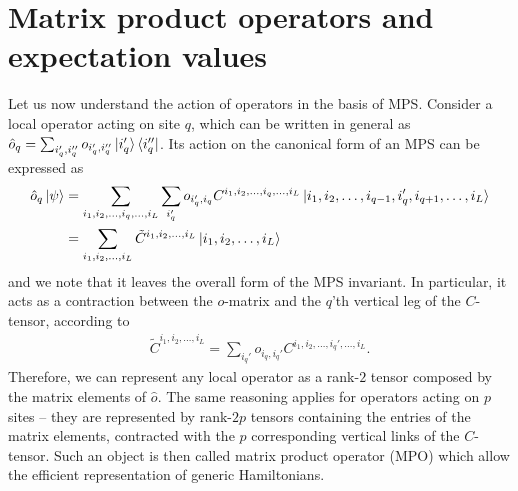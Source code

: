 \section{Matrix product operators and expectation values}
\label{sec:matrix_product_operators_and_expectation_values}
%
%
Let us now understand the action of operators in the basis of MPS.
Consider a local operator acting on site $q$, which can be written in general as $\hat o_q = \sum_{i_q',i_q''}o_{i_q',i_q''}\ket{i_q'}\bra{i_q''}$.
Its action on the canonical form of an MPS can be expressed as
\begin{align}
    \hat o_q\ket\psi &= \sum_{i_1,i_2,\dots,i_q,\dots,i_L}\sum_{i_q'}o_{i_q',i_q} C^{i_1,i_2,\dots,i_q,\dots,i_L}\ket{i_1,i_2,\dots,i_{q-1},i_q',i_{q+1},\dots,i_L}
    \\
    &= \sum_{i_1,i_2,\dots,i_L}\tilde C^{i_1,i_2,\dots,i_L}\ket{i_1,i_2,\dots,i_L}
\end{align}
and we note that it leaves the overall form of the MPS invariant.
In particular, it acts as a contraction between the $o$-matrix and the $q$'th vertical leg of the $C$-tensor, according to
\begin{align}
    \tilde C^{i_1,i_2,\dots,i_L} = \sum_{i_q'}o_{i_q,i_q'}C^{i_1,i_2,\dots,i_q',\dots,i_L}.
\end{align}
Therefore, we can represent any local operator as a rank-$2$ tensor composed by the matrix elements of $\hat o$.
The same reasoning applies for operators acting on $p$ sites -- they are represented by rank-$2p$ tensors containing the entries of the matrix elements, contracted with the $p$ corresponding vertical links of the $C$-tensor.
Such an object is then called matrix product operator (MPO) which allow the efficient representation of generic Hamiltonians.

